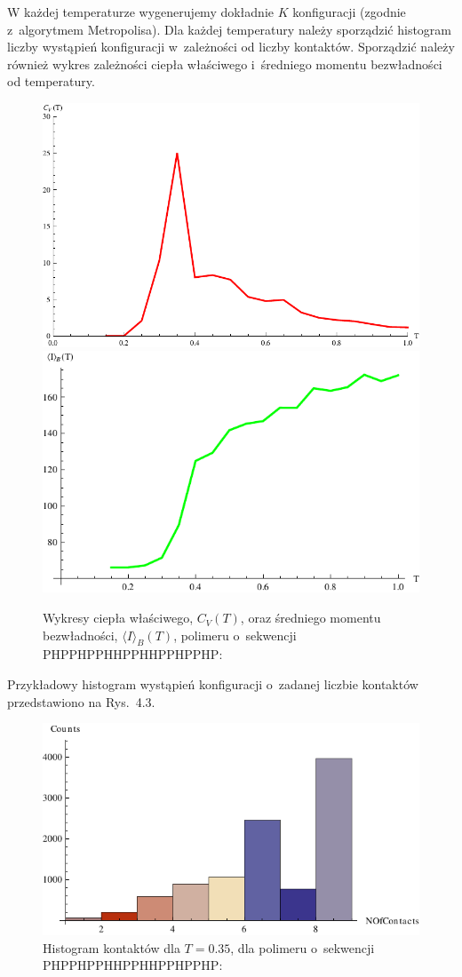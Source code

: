 \documentclass[a4paper,11pt,twoside]{book}
\begin{document}
W każdej temperaturze wygenerujemy dokładnie $K$ konfiguracji (zgodnie z~algorytmem Metropolisa). Dla każdej temperatury należy sporządzić histogram liczby wystąpień konfiguracji w~zależności od liczby kontaktów. Sporządzić należy również wykres zależności ciepła właściwego i~średniego momentu bezwładności od temperatury.
\begin{figure}[h!]
\label{cv}
\caption[To należy zmienić]
{
Wykresy ciepła właściwego, $C_V(T)$, oraz średniego momentu bezwładności, $\langle I \rangle_B(T)$, polimeru o~sekwencji PHPPHPPHHPPHHPPHPPHP:\\
}
\centering
\includegraphics[width=.49\textwidth]{cv}
\includegraphics[width=.49\textwidth]{gyr}
\end{figure}


Przykładowy histogram wystąpień konfiguracji o~zadanej liczbie kontaktów przedstawiono na Rys.~4.3. %
\begin{figure}[h!]
\label{hist}
\caption[To należy zmienić]
{
Histogram kontaktów dla $T=0.35$, dla polimeru o~sekwencji\\PHPPHPPHHPPHHPPHPPHP:
}
\centering
\includegraphics[width=.7\textwidth]{hist}
\end{figure}
\\
\end{document}
